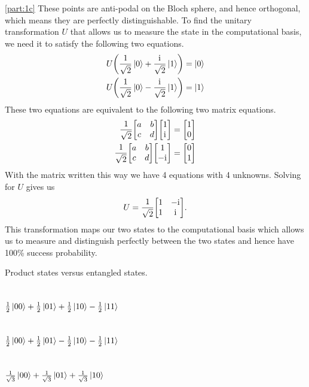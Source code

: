 \documentclass[boxes]{homework}
\newcommand{\iu}{\mathrm{i}\mkern1mu}
\begin{document}
\begin{solution}
	\ref{part:1c}
	These points are anti-podal on the Bloch sphere, and hence orthogonal, which means they are perfectly distinguishable. To find the unitary transformation $U$ that allows us to measure the state in the computational basis, we need it to satisfy the following two equations.
	\begin{align*}
		U\qty(\frac{1}{\sqrt{2}}\ket{0} + \frac{\iu}{\sqrt{2}}\ket{1}) & = \ket{0} \\
		U\qty(\frac{1}{\sqrt{2}}\ket{0} - \frac{\iu}{\sqrt{2}}\ket{1}) & = \ket{1}
	\end{align*}
	These two equations are equivalent to the following two matrix equations.
	\begin{align*}
		\frac{1}{\sqrt{2}}\mqty[a & b \\ c & d]\mqty[1 \\ \iu] & = \mqty[1 \\ 0] \\
		\frac{1}{\sqrt{2}}\mqty[a & b \\ c & d]\mqty[1 \\ -\iu] & = \mqty[0 \\ 1]
	\end{align*}
	With the matrix written this way we have 4 equations with 4 unknowns. Solving for $U$ gives us
	\begin{equation*}
		U = \frac{1}{\sqrt{2}}\mqty[1 & -\iu \\ 1 & \iu].
	\end{equation*}
	This transformation maps our two states to the computational basis which allows us to measure and distinguish perfectly between the two states and hence have 100\% success probability.
\end{solution}

\clearpage

\begin{problem}
Product states versus entangled states.
\begin{parts}
	\part{$\frac{1}{2}\ket{00} + \frac{1}{2}\ket{01} + \frac{1}{2}\ket{10} - \frac{1}{2}\ket{11}$}\label{part:2a}
	\part{$\frac{1}{2}\ket{00} + \frac{1}{2}\ket{01} - \frac{1}{2}\ket{10} - \frac{1}{2}\ket{11}$}\label{part:2b}
	\part{$\frac{1}{\sqrt{3}}\ket{00} + \frac{1}{\sqrt{3}}\ket{01} + \frac{1}{\sqrt{3}}\ket{10}$}\label{part:2c}
\end{parts}
\end{problem}
\end{document}
